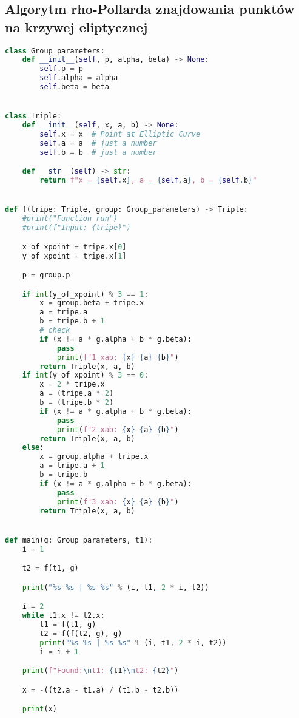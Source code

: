 \subsection*{Algorytm rho-Pollarda znajdowania punktów na krzywej eliptycznej}
\begin{lstlisting}[language=python, label=sage_5, caption=Algorytm rho-Pollarda znajdowania punktów na krzywej eliptycznej]
class Group_parameters:
    def __init__(self, p, alpha, beta) -> None:
        self.p = p
        self.alpha = alpha
        self.beta = beta


class Triple:
    def __init__(self, x, a, b) -> None:
        self.x = x  # Point at Elliptic Curve
        self.a = a  # just a number
        self.b = b  # just a number

    def __str__(self) -> str:
        return f"x = {self.x}, a = {self.a}, b = {self.b}"


def f(tripe: Triple, group: Group_parameters) -> Triple:
    #print("Function run")
    #print(f"Input: {tripe}")

    x_of_xpoint = tripe.x[0]
    y_of_xpoint = tripe.x[1]

    p = group.p

    if int(y_of_xpoint) % 3 == 1:
        x = group.beta + tripe.x
        a = tripe.a
        b = tripe.b + 1
        # check 
        if (x != a * g.alpha + b * g.beta):
            pass
            print(f"1 xab: {x} {a} {b}")
        return Triple(x, a, b)
    if int(y_of_xpoint) % 3 == 0:
        x = 2 * tripe.x
        a = (tripe.a * 2)
        b = (tripe.b * 2)
        if (x != a * g.alpha + b * g.beta):
            pass
            print(f"2 xab: {x} {a} {b}")
        return Triple(x, a, b)
    else:
        x = group.alpha + tripe.x
        a = tripe.a + 1
        b = tripe.b
        if (x != a * g.alpha + b * g.beta):
            pass
            print(f"3 xab: {x} {a} {b}")
        return Triple(x, a, b)


def main(g: Group_parameters, t1):
    i = 1

    t2 = f(t1, g)

    print("%s %s | %s %s" % (i, t1, 2 * i, t2))

    i = 2
    while t1.x != t2.x:
        t1 = f(t1, g)
        t2 = f(f(t2, g), g)
        print("%s %s | %s %s" % (i, t1, 2 * i, t2))
        i = i + 1

    print(f"Found:\nt1: {t1}\nt2: {t2}")

    x = -((t2.a - t1.a) / (t1.b - t2.b))

    print(x)
\end{lstlisting}